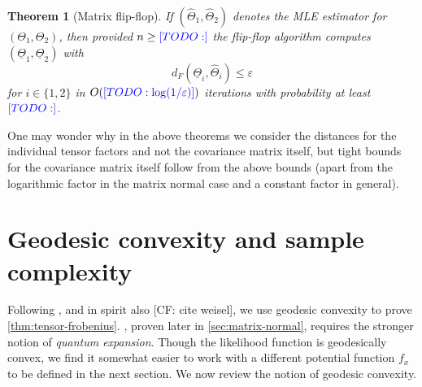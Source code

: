 \documentclass{article}
\newtheorem{theorem}{Theorem}
\newcommand\eps{\varepsilon}
\newcommand\samp{x}
\newcommand{\CF}[1]{{\color{purple}[CF: #1]}}
\newcommand{\TODO}[1]{{\color{blue}[TODO: #1]}}
\begin{document}
\begin{theorem}[Matrix flip-flop]\label{thm:matrix-flipflop} If $(\hat{\Theta}_1, \hat{\Theta}_2) $ denotes the MLE estimator for $(\Theta_1, \Theta_2)$, then provided $n \geq \TODO{}$ the flip-flop algorithm computes $(\underline{\Theta}_1, \underline{\Theta}_2)$ with
$$ d_F(\underline{\Theta}_i, \hat{\Theta}_i) \leq \eps $$
for $i \in \{1,2\}$ in $O(\TODO{\log(1/\eps)})$ iterations with probability at least $\TODO{}$.
\end{theorem}

One may wonder why in the above theorems we consider the distances for the individual tensor factors and not the covariance matrix itself, but tight bounds for the covariance matrix itself follow from the above bounds (apart from the logarithmic factor in the matrix normal case and a constant factor in general).




\section{Geodesic convexity and sample complexity}\label{subsec:outline}


Following \cite{FM20}, and in spirit also \CF{cite weisel}, we use geodesic convexity to prove \cref{thm:tensor-frobenius}.
, proven later in \cref{sec:matrix-normal}, requires the stronger notion of \emph{quantum expansion}. Though the likelihood function is geodesically convex, we find it somewhat easier to work with a different potential function $f_{\samp}$ to be defined in the next section. We now review the notion of geodesic convexity. 



\end{document}
